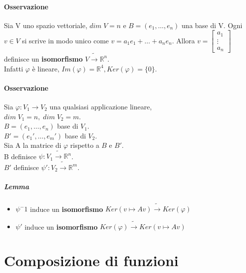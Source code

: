 \documentclass[a4paper, 12pt]{report}
\begin{document}
        \paragraph{Osservazione} Sia V uno spazio vettoriale, $dim \; V=n$ e $B=(e_1,\dots,e_n)$ una base di V.
        Ogni $v \in V$ si scrive in modo unico come $v=a_1e_1+\dots+a_ne_n$.
        Allora $v=
        \begin{bmatrix}
            a_1\\
            \vdots\\
            a_n
        \end{bmatrix}
        $ definisce un \textbf{isomorfismo} $V \tilde{\rightarrow}\mathbb{R}^n$.\\
        Infatti $\varphi$ è lineare, $Im(\varphi)=\mathbb{R}^4, Ker(\varphi)=\{0\}$.
        \paragraph{Osservazione} Sia $\varphi:V_1 \rightarrow V_2$ una qualsiasi applicazione lineare,\\
        $dim \; V_1=n,\; dim \; V_2=m$.\\
        $B=(e_1,\dots,e_n)$ base di $V_1$.\\
        $B'=(e_1',\dots,e_m')$ base di $V_2$.\\
        Sia A la matrice di $\varphi$ rispetto a $B \text{ e } B'$.\\
        B definisce $\psi: V_1 \tilde{\rightarrow}\mathbb{R}^n$.\\
        $B'$ definisce $\psi': V_2 \tilde{\rightarrow}\mathbb{R}^m$.
        \subparagraph{Lemma}
        \begin{itemize}
            \item $\psi^-1$ induce un \textbf{isomorfismo} $Ker(v\mapsto Av)\tilde{\rightarrow}Ker(\varphi)$
            \item $\psi'$ induce un \textbf{isomorfismo} $Ker(\varphi)\tilde{\rightarrow}Ker(v\mapsto Av)$
        \end{itemize}
        \section{Composizione di funzioni}
\end{document}
